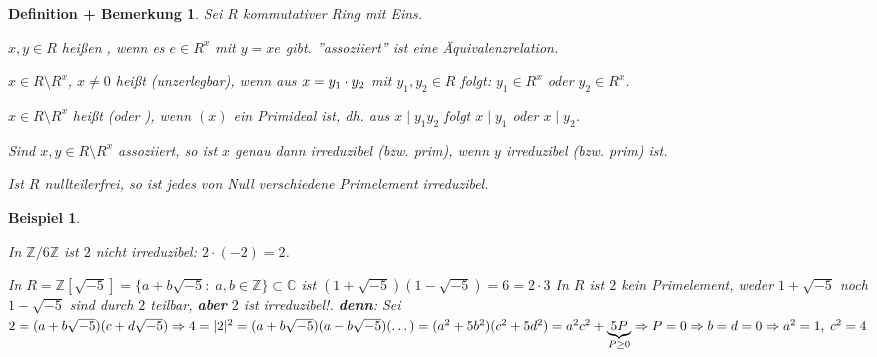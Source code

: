 \documentclass[a4paper,10pt,german]{scrbook}
\theoremstyle{saetze}
\theoremstyle{definitionen}
\newtheorem{DefBem}[Def]{Definition + Bemerkung}
\newtheorem{Bsp}[Def]{Beispiel}
\begin{document}
\begin{DefBem}
Sei $R$ kommutativer Ring mit
Eins.
\begin{enum}
\item $x,y \in R$ heißen , wenn es $e \in R^x$ mit
$y=xe$ gibt. ''assoziiert'' ist eine Äquivalenzrelation.

\item $x \in R\setminus R^x$, $x\ne 0$ heißt  (unzerlegbar), wenn aus $x=y_1
\cdot y_2$ mit $y_1,y_2 \in R$ folgt: $y_1 \in R^x$ oder $y_2 \in
R^x$.

\item $x \in R\setminus R^x$ heißt  (oder
), wenn $(x)$ ein Primideal ist, dh. aus $x \mid y_1
y_2$ folgt $x \mid y_1$ oder $x \mid y_2$.

\item Sind $x,y \in R \setminus R^x$ assoziiert, so ist $x$ genau
dann irreduzibel (bzw. prim), wenn $y$ irreduzibel (bzw. prim) ist.

\item Ist $R$ nullteilerfrei, so ist jedes von Null verschiedene Primelement irreduzibel.

\end{enum}
\end{DefBem}

\begin{Bsp}
\begin{enum}
\item In $\mathbb Z/6\mathbb Z$ ist $2$ nicht irreduzibel: $2\cdot(-2)=2$.
\item 
In $R=\mathbb{Z}[\sqrt{-5}] = \{a + b\sqrt{-5}:\;a,b \in \mathbb{Z} \}
\subset \mathbb{C}$ ist $(1+\sqrt{-5})(1-\sqrt{-5}) =  6= 2\cdot 3$
\newline In $R$ ist $2$ kein Primelement, weder $1+\sqrt{-5}$ noch
$1-\sqrt{-5}$ sind durch $2$ teilbar, \textbf{aber} $2$ ist
irreduzibel!.
\newline \textbf{denn}: Sei $2 = (a+b\sqrt{-5})(c+d\sqrt{-5}) \Rightarrow 4
= |2|^2 = (a+b\sqrt{-5})(a-b\sqrt{-5})(\dots) = (a^2 +
5b^2)(c^2+5d^2) = a^2c^2 + \underset{P \geq 0}{\underbrace{5P}} \Rightarrow P =
0 \Rightarrow b = d = 0 \Rightarrow a^2 = 1,\; c^2 = 4$
\end{enum}
\end{Bsp}
\end{document}
